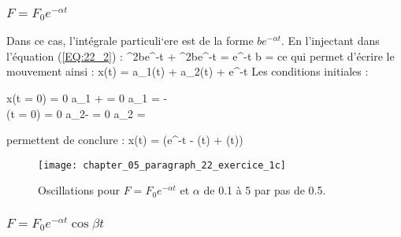 \subsubsection{$F = F_{0}e^{-\alpha t}$}

Dans ce cas, l'int\'egrale particuli`ere est de la forme $be^{-\alpha t}$. En l'injectant dans l'\'equation (\ref{EQ:22_2}) :
\be
	\alpha^{2}be^{-\alpha t} + \omega^{2}be^{-\alpha t} = e^{-\alpha t} \Leftrightarrow b = 
\ee
ce qui permet d'\'ecrire le mouvement ainsi :
\be
	x(t) = a_{1}\cos(\omega t) + a_{2}\sin(\omega t) + e^{-\alpha t}
\ee
Les conditions initiales :
\be
	\begin{cases}
	x(t = 0) = 0 \Leftrightarrow a_{1} +  = 0 \Leftrightarrow a_{1} = - \\
	(t = 0) = 0 \Leftrightarrow a_{2}\omega -  = 0 \Leftrightarrow a_{2} = 
	\end{cases}
\ee
permettent de conclure :
\be
	x(t) = \left(e^{-\alpha t} - \cos(\omega t) + \dfrac{\alpha}{\omega}\sin(\omega t)\right)
\ee

\begin{figure}[htb!]
	\begin{center}
		\texttt{[image: chapter\_05\_paragraph\_22\_exercice\_1c]}
		\caption{Oscillations pour $F = F_{0}e^{-\alpha t}$ et $\alpha$ de 0.1 à 5 par pas de 0.5.}\label{FIG:22_1_c}
	\end{center}
\end{figure}

\subsubsection{$F = F_{0}e^{-\alpha t}\cos\beta t$}

